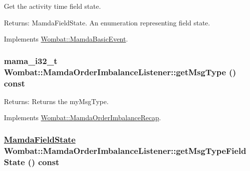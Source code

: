 Get the activity time field state. 

\begin{Desc}
\item[Returns:]Mamda\-Field\-State. An enumeration representing field state. \end{Desc}


Implements \hyperlink{classWombat_1_1MamdaBasicEvent_a61a566e3442181ca1fadc4524296cd0}{Wombat::Mamda\-Basic\-Event}.\hypertarget{classWombat_1_1MamdaOrderImbalanceListener_041c934f699fe71fb16d9154bc444bf0}{
\subsubsection[getMsgType]{\setlength{\rightskip}{0pt plus 5cm}mama\_\-i32\_\-t Wombat::Mamda\-Order\-Imbalance\-Listener::get\-Msg\-Type () const}}
\label{classWombat_1_1MamdaOrderImbalanceListener_041c934f699fe71fb16d9154bc444bf0}


\begin{Desc}
\item[Returns:]Returns the my\-Msg\-Type. \end{Desc}


Implements \hyperlink{classWombat_1_1MamdaOrderImbalanceRecap_45cda967241f1a5ff39a115c1395d06b}{Wombat::Mamda\-Order\-Imbalance\-Recap}.\hypertarget{classWombat_1_1MamdaOrderImbalanceListener_69ecc694f33d3fb39064a3fa1b0d8ef3}{
\subsubsection[getMsgTypeFieldState]{\setlength{\rightskip}{0pt plus 5cm}\hyperlink{namespaceWombat_93aac974f2ab713554fd12a1fa3b7d2a}{Mamda\-Field\-State} Wombat::Mamda\-Order\-Imbalance\-Listener::get\-Msg\-Type\-Field\-State () const}}
\label{classWombat_1_1MamdaOrderImbalanceListener_69ecc694f33d3fb39064a3fa1b0d8ef3}


